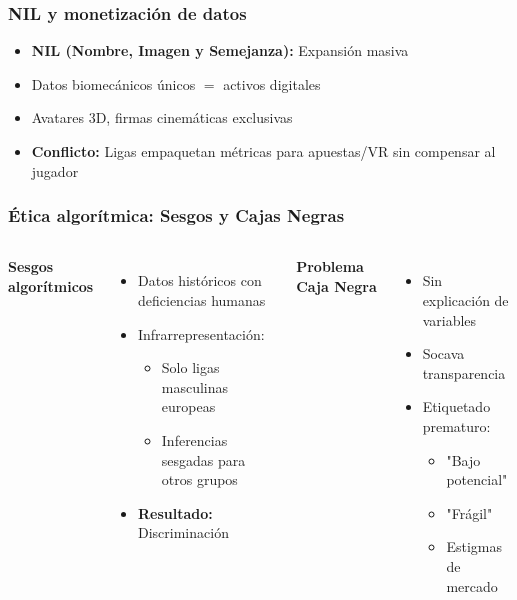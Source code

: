 \documentclass[aspectratio=169]{beamer}
\begin{document}
\begin{frame}\frametitle{NIL y monetización de datos}
\begin{itemize}
    \item \textbf{NIL (Nombre, Imagen y Semejanza):} Expansión masiva
    \item Datos biomecánicos únicos $=$ activos digitales
    \item Avatares 3D, firmas cinemáticas exclusivas
    \item \textbf{Conflicto:} Ligas empaquetan métricas para apuestas/VR sin compensar al jugador
\end{itemize}
\end{frame}

\begin{frame}\frametitle{Ética algorítmica: Sesgos y Cajas Negras}
\begin{columns}[T]
\textbf{Sesgos algorítmicos}
\begin{itemize}
    \item Datos históricos con deficiencias humanas
    \item Infrarrepresentación:
    \begin{itemize}
        \item Solo ligas masculinas europeas
        \item Inferencias sesgadas para otros grupos
    \end{itemize}
    \item \textbf{Resultado:} Discriminación
\end{itemize}

\textbf{Problema Caja Negra}
\begin{itemize}
    \item Sin explicación de variables
    \item Socava transparencia
    \item Etiquetado prematuro:
    \begin{itemize}
        \item "Bajo potencial"
        \item "Frágil"
        \item Estigmas de mercado
    \end{itemize}
\end{itemize}
\end{columns}
\end{frame}
\end{document}
